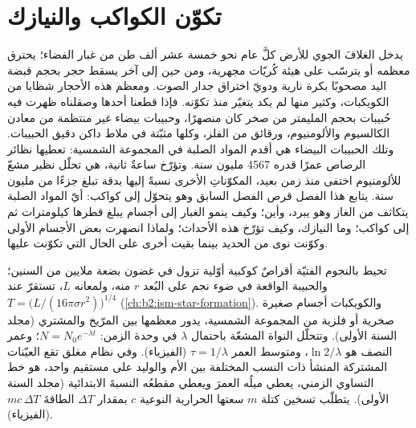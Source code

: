 \chapter{تكوّن الكواكب والنيازك}\label{ch:b2:planet-formation-meteorites}

يدخل الغلافَ الجوي للأرض كلَّ عام نحو خمسة عشر ألف طن من غبار الفضاء؛ يحترق معظمه
أو يترسّب على هيئة كُريّات مجهرية، ومن حين إلى آخر يسقط حجر بحجم قبضة اليد مصحوبًا
بكرة نارية ودويّ اختراق جدار الصوت. ومعظم هذه الأحجار شظايا من الكويكبات، وكثير منها
لم يكد يتغيّر منذ تكوّنه. فإذا قطعنا أحدها وصقلناه ظهرت فيه حُبيبات بحجم المليمتر من
صخر كان منصهرًا، وحبيبات بيضاء غير منتظمة من معادن الكالسيوم والألومنيوم، ورقائق من
الفلز، وكلها مثبّتة في ملاط داكن دقيق الحبيبات. وتلك الحبيبات البيضاء هي أقدم المواد
الصلبة في المجموعة الشمسية: تعطيها نظائر الرصاص عمرًا قدره 4567 مليون سنة. وتؤرّخ ساعةٌ ثانية،
هي تحلّل نظير مشعّ للألومنيوم اختفى منذ زمن بعيد، المكوّناتِ الأخرى نسبةً إليها بدقة
تبلغ جزءًا من مليون سنة. يتابع هذا الفصل قرص الفصل السابق وهو يتحوّل إلى كواكب: أيّ
المواد الصلبة يتكاثف من الغاز وهو يبرد، وأين؛ وكيف ينمو الغبار إلى أجسام يبلغ قطرها
كيلومترات ثم إلى كواكب؛ وما النيازك، وكيف تؤرّخ هذه الأحداث؛ ولماذا انصهرت بعض
الأجسام الأولى وكوّنت نوى من الحديد بينما بقيت أخرى على الحال التي تكوّنت
عليها.

\begin{recall}
تحيط بالنجوم الفتيّة أقراصٌ كوكبية أوّلية تزول في غضون بضعة ملايين من السنين؛ والحبيبة
الواقعة في ضوء نجم على البُعد $r$ منه، ولمعانه $L$، تستقرّ عند $T = \bigl(L/(16\pi\sigma r^2)\bigr)^{1/4}$
(\cref{ch:b2:ism-star-formation}). والكويكبات أجسام صغيرة صخرية أو فلزية من المجموعة
الشمسية، يدور معظمها بين المرّيخ والمشتري (مجلد السنة
الأولى). وتتحلّل النواة المشعّة باحتمال $\lambda$ في وحدة
الزمن: $N = N_0 e^{-\lambda t}$؛ وعمر النصف هو $\ln 2/\lambda$، ومتوسط
العمر $\tau = 1/\lambda$ (الفيزياء). وفي نظام مغلق تقع العيّنات المشتركة المنشأ ذات
النسب المختلفة بين الأم والوليد على مستقيم واحد، هو خط التساوي الزمني، يعطي ميلُه العمرَ
ويعطي مقطعُه النسبةَ الابتدائية (مجلد السنة الأولى).
يتطلّب تسخين كتلة $m$ سعتها الحرارية النوعية $c$ بمقدار $\Delta T$ الطاقةَ
$mc\,\Delta T$ (الفيزياء).
\end{recall}

